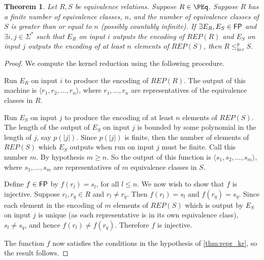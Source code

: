 \documentclass{article}
\newtheorem{theorem}{Theorem}[section]
\theoremstyle{definition} \newtheorem{definition}[definition]{Definition}
\newcommand{\sigmastar}{\Sigma^{*}} %
\newcommand{\kr}{\leq^{p}_{ker}} %
\newcommand{\defn}[1]{\emph{#1}} %
\begin{document}
\begin{theorem}
  Let $R,S$ be equivalence relations. Suppose $R\in\PEq$. Suppose $R$ has a
  finite number of equivalence classes, $n$, and the number of equivalence
  classes of $S$ is greater than or equal to $n$ (possibly countably
  infinite). If $\exists E_R,E_S\in{\ensuremath{\mathsf{FP}}}$ and $\exists i,j\in\sigmastar$ such
  that $E_R$ on input $i$ outputs the encoding of $REP(R)$ and $E_S$ on input
  $j$ outputs the encoding of at least $n$ elements of $REP(S)$, then $R\kr S$.
\end{theorem}
\begin{proof}
  We compute the kernel reduction using the following procedure.

  Run $E_R$ on input $i$ to produce the encoding of $REP(R)$. The output of
  this machine is $\langle r_1, r_2, \ldots, r_n\rangle$, where $r_1,\dots,r_n$
  are representatives of the equivalence classes in $R$.

  Run $E_S$ on input $j$ to produce the encoding of at least $n$ elements of
  $REP(S)$. The length of the output of $E_S$ on input $j$ is bounded by some
  polynomial in the length of $j$, say $p(|j|)$. Since $p(|j|)$ is finite, then
  the number of elements of $REP(S)$ which $E_S$ outputs when run on input $j$
  must be finite. Call this number $m$. By hypothesis $m\geq n$. So the output
  of this function is $\langle s_1, s_2, \ldots, s_m\rangle$, where
  $s_1,\ldots, s_m$ are representatives of $m$ equivalence classes in $S$.

  Define $f\in{\ensuremath{\mathsf{FP}}}$ by $f(r_l)=s_l$, for all $l\leq n$. We now wish to show that
  $f$ is injective. Suppose $r_l,r_q\in R$ and $r_l\neq r_q$. Then $f(r_l)=s_l$
  and $f(r_q)=s_q$. Since each element in the encoding of $m$ elements of
  $REP(S)$ which is output by $E_S$ on input $j$ is unique (as each
  representative is in its own equivalence class), $s_l\neq s_q$, and hence
  $f(r_l)\neq f(r_q)$. Therefore $f$ is injective.

  The function $f$ now satisfies the conditions in the hypothesis of
  \autoref{thm:repr_kr}, so the result follows.
\end{proof}



\end{document}

